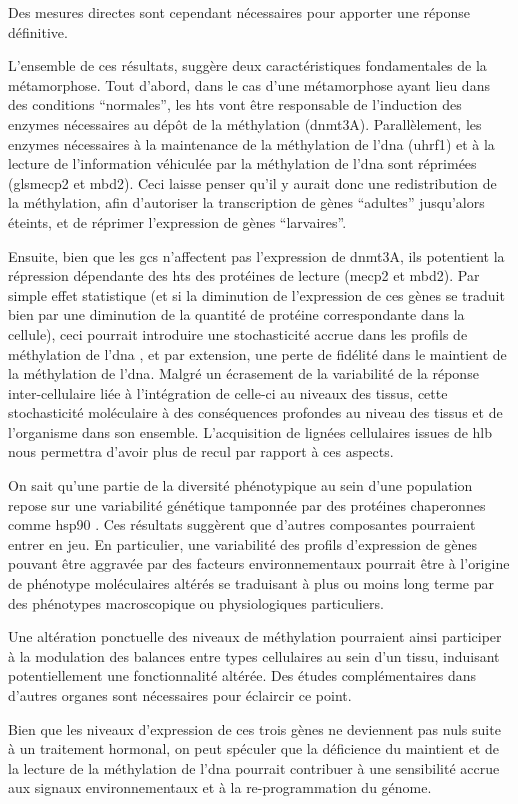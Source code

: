 \documentclass[../main.tex]{subfiles}
\begin{document}
Des mesures directes sont cependant nécessaires pour apporter une réponse définitive.
\par
L'ensemble de ces résultats, suggère deux caractéristiques fondamentales de la métamorphose.
Tout d'abord, dans le cas d'une métamorphose ayant lieu dans des conditions ``normales'', les \glspl{ht} vont être responsable de l'induction des enzymes nécessaires au dépôt de la méthylation (\gls{dnmt}3A).
Parallèlement, les enzymes nécessaires à la maintenance de la méthylation de l'\gls{dna} (\gls{uhrf1}) et à la lecture de l'information véhiculée par la méthylation de l'\gls{dna} sont réprimées (gls{mecp2} et \gls{mbd}2).
Ceci laisse penser qu'il y aurait donc une redistribution de la méthylation, afin d’autoriser la transcription de gènes ``adultes'' jusqu'alors éteints, et de réprimer l'expression de gènes ``larvaires''.
\par
Ensuite, bien que les \glspl{gc} n'affectent pas l'expression de \gls{dnmt}3A, ils potentient la répression dépendante des \glspl{ht} des protéines de lecture (\gls{mecp2} et \gls{mbd}2).
Par simple effet statistique (et si la diminution de l'expression de ces gènes se traduit bien par une diminution de la quantité de protéine correspondante dans la cellule), ceci pourrait introduire une stochasticité accrue dans les profils de méthylation de l'\gls{dna} \citep{Xie2011,Landan2012}, et par extension, une perte de fidélité dans le maintient de la méthylation de l'\gls{dna}.
Malgré un écrasement de la variabilité de la réponse inter-cellulaire liée à l'intégration de celle-ci au niveaux des tissus, cette stochasticité moléculaire à des conséquences profondes au niveau des tissus et de l'organisme dans son ensemble.
L'acquisition de lignées cellulaires issues de \gls{hlb} \citep{Sinzelle2012} nous permettra d'avoir plus de recul par rapport à ces aspects.
\par
On sait qu'une partie de la diversité phénotypique au sein d'une population repose sur une variabilité génétique tamponnée par des protéines chaperonnes comme \gls{hsp90} \citep{Queitsch2002}.
Ces résultats suggèrent que d'autres composantes pourraient entrer en jeu.
En particulier, une variabilité des profils d’expression de gènes pouvant être aggravée par des facteurs environnementaux pourrait être à l'origine de phénotype moléculaires altérés se traduisant à plus ou moins long terme par des phénotypes macroscopique ou physiologiques particuliers.
\par
Une altération ponctuelle des niveaux de méthylation pourraient ainsi participer à la modulation des balances entre types cellulaires au sein d'un tissu, induisant potentiellement une fonctionnalité altérée.
Des études complémentaires dans d'autres organes sont nécessaires pour éclaircir ce point.
\par
Bien que les niveaux d'expression de ces trois gènes ne deviennent pas nuls suite à un traitement hormonal, on peut spéculer que la déficience du maintient et de la lecture de la méthylation de l'\gls{dna} pourrait contribuer à une sensibilité accrue aux signaux environnementaux et à la re-programmation du génome.
\end{document}
